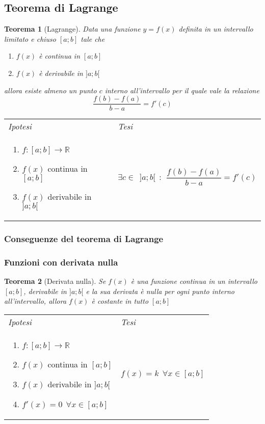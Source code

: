 \documentclass{article}     %
\newcommand\R{\mathbb{R}}
\newtheorem*{theorem}{Teorema}
\newenvironment{shadedTheorem}%
  {\begin{mdframed}[backgroundcolor=lightgray!40, linecolor=white, innertopmargin=4pt, innerbottommargin=13pt]\begin{theorem}}%
  {\end{theorem}\end{mdframed}}
\begin{document}
    \subsection{Teorema di Lagrange}
        \begin{shadedTheorem}[Lagrange]
        Data una funzione $y=f(x)$ definita in un intervallo limitato e chiuso $[a;b]$ tale che \begin{enumerate}
            \item $f(x)$ è continua in $[a;b]$
            \item $f(x)$ è derivabile in $]a;b[$
        \end{enumerate}
        allora esiste almeno un punto $c$ interno all'intervallo per il quale vale la relazione \[\frac{f(b)-f(a)}{b-a}=f'(c)\]
        \end{shadedTheorem}
        \begin{tabular}{m{}m{}}
            \textit{Ipotesi} & \textit{Tesi}  \\
            \begin{enumerate}
            \item $f:[a;b] \to \R$
            \item $f(x)$ continua in $[a;b]$
            \item $f(x)$ derivabile in $]a;b[$
        \end{enumerate} & $\exists c \in~~]a;b[ ~~:~~ \dfrac{f(b)-f(a)}{b-a}=f'(c)$
        \end{tabular}
        \subsubsection*{Conseguenze del teorema di Lagrange}
        \subsubsection{Funzioni con derivata nulla}
            \begin{shadedTheorem}[Derivata nulla]
                Se $f(x)$ è una funzione continua in un intervallo $[a;b]$, derivabile in $]a;b[$ e la sua derivata è nulla per ogni punto interno all'intervallo, allora $f(x)$ è costante in tutto $[a;b]$
            \end{shadedTheorem}
            \begin{tabular}{m{}m{}}
                \textit{Ipotesi} & \textit{Tesi}  \\ 
                \begin{enumerate}
                \item $f:[a;b] \to \R$
                \item $f(x)$ continua in $[a;b]$
                \item $f(x)$ derivabile in $]a;b[$
                \item $f'(x)=0~~\forall x \in [a;b]$
        \end{enumerate} & $f(x)=k ~~ \forall x \in [a;b]$
           \end{tabular}
           
\end{document}
